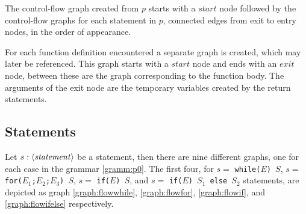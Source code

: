 The control-flow graph created from $p$ starts with a $\mathit{start}$ node followed by the control-flow graphs for each statement in $p$, connected edges from exit to entry nodes, in the order of appearance. 

For each function definition encountered a separate graph is created, which may later be referenced. This graph starts with a $\mathit{start}$ node and ends with an $\mathit{exit}$ node, between these are the graph corresponding to the function body. The arguments of the exit node are the temporary variables created by the return statements. 

\subsection{Statements}
Let $s : \langle\mathit{statement}\rangle$ be a statement, then there are nine different graphs, one for each case in the grammar \ref{gramm:p0}. The first four, for $s = $ \texttt{while($E$) $S$}, $s = $ \texttt{for($E_1$;$ E_2$;$E_3$) $S$}, $s = $ \texttt{if($E$) $S$}, and $s = $ \texttt{if($E$) $S_1$ else $S_2$} statements, are depicted as graph \ref{graph:flowwhile}, \ref{graph:flowfor}, \ref{graph:flowif}, and \ref{graph:flowifelse} respectively.


